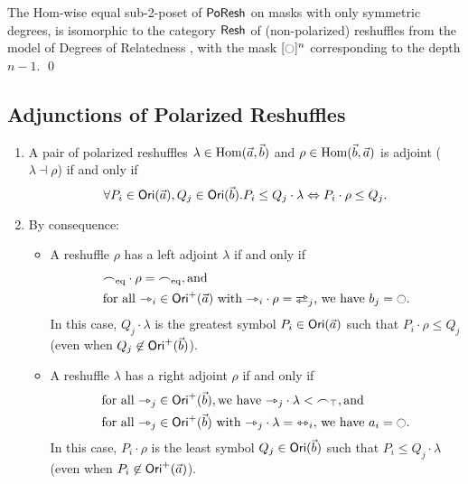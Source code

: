 \documentclass[a4paper]{memoir}
\begin{document}
\begin{corollary}
	The Hom-wise equal sub-2-poset of $\mathsf{PoResh}$ on masks with only symmetric degrees, is isomorphic to the category $\mathsf{Resh}$ of (non-polarized) reshuffles from the model of Degrees of Relatedness \cite[def.\ 6.2.7]{reldtt-techreport}\cite{reldtt}, with the mask $[\npolar]^n$ corresponding to the depth $n-1$. \qed
\end{corollary}

\subsection{Adjunctions of Polarized Reshuffles}
\begin{theorem}\label{thm:poresh-adjoint}
	\begin{enumerate}
		\item A pair of polarized reshuffles $\lambda \in {\mathrm{Hom}}(\vec a, \vec b)$ and $\rho \in {\mathrm{Hom}}(\vec b, \vec a)$ is adjoint ($\lambda \dashv \rho$) if and only if
		\begin{equation} \label{eq:poresh-adjoint-crit}
			\forall P_i \in {\mathsf{Ori}}(\vec a), Q_j \in {\mathsf{Ori}}(\vec b). P_i \leq Q_j \cdot \lambda \Leftrightarrow P_i \cdot \rho \leq Q_j.
		\end{equation}
		\item By consequence:
		\begin{itemize}
			\item A reshuffle $\rho$ has a left adjoint $\lambda$ if and only if
			\begin{align}
				&\eqtysym \cdot \rho = \eqtysym, \text{and} \label{eq:poresh-left-adjoint-crit1} \\
				&\text{for all } \jetsym_i \in \orisymbolfwd(\vec a) \text{ with } \jetsym_i \cdot \rho = \infrajetsym_j \text{, we have } b_j = \npolar. \label{eq:poresh-left-adjoint-crit2}
			\end{align}
			In this case, $Q_j \cdot \lambda$ is the greatest symbol $P_i \in {\mathsf{Ori}}(\vec a)$ such that $P_i \cdot \rho \leq Q_j$ (even when $Q_j \not\in {\mathsf{Ori}}^+(\vec b)$).
			
			\item A reshuffle $\lambda$ has a right adjoint $\rho$ if and only if
			\begin{align}
				&\text{for all } \jetsym_j \in \orisymbolfwd(\vec b), \text{we have } \jetsym_j \cdot \lambda < \topsym, \text{and} \label{eq:poresh-right-adjoint-crit1} \\
				&\text{for all } \jetsym_j \in \orisymbolfwd(\vec b) \text{ with } \jetsym_j \cdot \lambda = \equijetsym_i \text{, we have } a_i = \npolar. \label{eq:poresh-right-adjoint-crit2}
			\end{align}
			In this case, $P_i \cdot \rho$ is the least symbol $Q_j \in {\mathsf{Ori}}(\vec b)$ such that $P_i \leq Q_j \cdot \lambda$ (even when $P_i \not\in {\mathsf{Ori}}^+(\vec a)$).
		\end{itemize}
	\end{enumerate}
\end{theorem}
\end{document}

